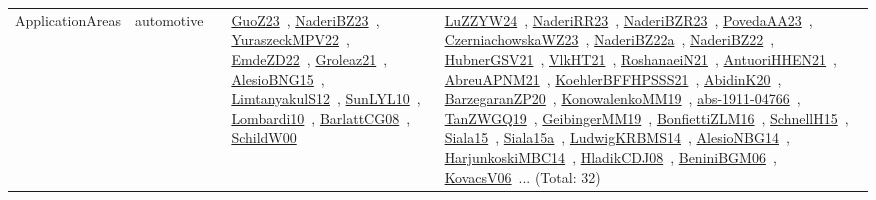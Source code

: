 {\begin{longtable}{lp{3cm}>{\raggedright\arraybackslash}p{6cm}>{\raggedright\arraybackslash}p{6cm}>{\raggedright\arraybackslash}p{8cm}}
\index{automotive}\index{ApplicationAreas!automotive}ApplicationAreas & automotive &  & \href{../works/GuoZ23.pdf}{GuoZ23}~\cite{GuoZ23}, \href{../works/NaderiBZ23.pdf}{NaderiBZ23}~\cite{NaderiBZ23}, \href{../works/YuraszeckMPV22.pdf}{YuraszeckMPV22}~\cite{YuraszeckMPV22}, \href{../works/EmdeZD22.pdf}{EmdeZD22}~\cite{EmdeZD22}, \href{../works/Groleaz21.pdf}{Groleaz21}~\cite{Groleaz21}, \href{../works/AlesioBNG15.pdf}{AlesioBNG15}~\cite{AlesioBNG15}, \href{../works/LimtanyakulS12.pdf}{LimtanyakulS12}~\cite{LimtanyakulS12}, \href{../works/SunLYL10.pdf}{SunLYL10}~\cite{SunLYL10}, \href{../works/Lombardi10.pdf}{Lombardi10}~\cite{Lombardi10}, \href{../works/BarlattCG08.pdf}{BarlattCG08}~\cite{BarlattCG08}, \href{../works/SchildW00.pdf}{SchildW00}~\cite{SchildW00} & \href{../works/LuZZYW24.pdf}{LuZZYW24}~\cite{LuZZYW24}, \href{../works/NaderiRR23.pdf}{NaderiRR23}~\cite{NaderiRR23}, \href{../works/NaderiBZR23.pdf}{NaderiBZR23}~\cite{NaderiBZR23}, \href{../works/PovedaAA23.pdf}{PovedaAA23}~\cite{PovedaAA23}, \href{../works/CzerniachowskaWZ23.pdf}{CzerniachowskaWZ23}~\cite{CzerniachowskaWZ23}, \href{../works/NaderiBZ22a.pdf}{NaderiBZ22a}~\cite{NaderiBZ22a}, \href{../works/NaderiBZ22.pdf}{NaderiBZ22}~\cite{NaderiBZ22}, \href{../works/HubnerGSV21.pdf}{HubnerGSV21}~\cite{HubnerGSV21}, \href{../works/VlkHT21.pdf}{VlkHT21}~\cite{VlkHT21}, \href{../works/RoshanaeiN21.pdf}{RoshanaeiN21}~\cite{RoshanaeiN21}, \href{../works/AntuoriHHEN21.pdf}{AntuoriHHEN21}~\cite{AntuoriHHEN21}, \href{../works/AbreuAPNM21.pdf}{AbreuAPNM21}~\cite{AbreuAPNM21}, \href{../works/KoehlerBFFHPSSS21.pdf}{KoehlerBFFHPSSS21}~\cite{KoehlerBFFHPSSS21}, \href{../works/AbidinK20.pdf}{AbidinK20}~\cite{AbidinK20}, \href{../works/BarzegaranZP20.pdf}{BarzegaranZP20}~\cite{BarzegaranZP20}, \href{../works/KonowalenkoMM19.pdf}{KonowalenkoMM19}~\cite{KonowalenkoMM19}, \href{../works/abs-1911-04766.pdf}{abs-1911-04766}~\cite{abs-1911-04766}, \href{../works/TanZWGQ19.pdf}{TanZWGQ19}~\cite{TanZWGQ19}, \href{../works/GeibingerMM19.pdf}{GeibingerMM19}~\cite{GeibingerMM19}, \href{../works/BonfiettiZLM16.pdf}{BonfiettiZLM16}~\cite{BonfiettiZLM16}, \href{../works/SchnellH15.pdf}{SchnellH15}~\cite{SchnellH15}, \href{../works/Siala15.pdf}{Siala15}~\cite{Siala15}, \href{../works/Siala15a.pdf}{Siala15a}~\cite{Siala15a}, \href{../works/LudwigKRBMS14.pdf}{LudwigKRBMS14}~\cite{LudwigKRBMS14}, \href{../works/AlesioNBG14.pdf}{AlesioNBG14}~\cite{AlesioNBG14}, \href{../works/HarjunkoskiMBC14.pdf}{HarjunkoskiMBC14}~\cite{HarjunkoskiMBC14}, \href{../works/HladikCDJ08.pdf}{HladikCDJ08}~\cite{HladikCDJ08}, \href{../works/BeniniBGM06.pdf}{BeniniBGM06}~\cite{BeniniBGM06}, \href{../works/KovacsV06.pdf}{KovacsV06}~\cite{KovacsV06}... (Total: 32)\\

\end{longtable}}

